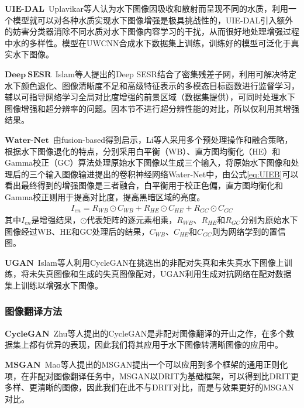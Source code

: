 $\mathbf{UIE}$-$\mathbf{DAL}$~Uplavikar等人\cite{uplavikar2019all}认为水下图像因吸收和散射而呈现不同的水质，利用一个模型就可以对各种水质实现水下图像增强是极具挑战性的，UIE-DAL引入额外的妨害分类器消除不同水质对水下图像内容学习的干扰，从而很好地处理增强过程中水的多样性。模型在UWCNN合成水下数据集上训练，训练好的模型可泛化于真实水下图像。

$\mathbf{Deep~SESR}$~Islam等人\cite{islam2020simultaneous}提出的Deep SESR结合了密集残差子网，利用可解决特定水下颜色退化、图像清晰度不足和高级特征表示的多模态目标函数进行监督学习，辅以可指导网络学习全局对比度增强的前景区域（数据集提供），可同时处理水下图像增强和超分辨率的问题。因本节不进行超分辨性能的对比，所以仅利用其增强结果。

$\mathbf{Water}$-$\mathbf{Net}$~由fusion-based\cite{ancuti2012enhancing}得到启示，Li等人\cite{li2019underwater}采用多个预处理操作和融合策略，根据水下图像退化的特点，分别采用白平衡（WB）、直方图均衡化（HE）和Gamma校正（GC）算法处理原始水下图像以生成三个输入，将原始水下图像和处理后的三个输入图像输进提出的卷积神经网络Water-Net中，由公式\ref{eq:UIEB}可以看出最终得到的增强图像是三者融合，白平衡用于校正色偏，直方图均衡化和Gamma校正则用于提高对比度，提高黑暗区域的亮度。
\begin{equation}
\begin{split}
I_{en}=R_{WB}\odot C_{WB}+R_{HE}\odot C_{HE}+R_{GC}\odot C_{GC}
\end{split}
\label{eq:UIEB}
\end{equation}
其中$I_{en}$是增强结果，$\odot$代表矩阵的逐元素相乘，$R_{WB}$、$R_{HE}$和$R_{GC}$分别为原始水下图像经过WB、HE和GC处理后的结果，$C_{WB}$、$C_{HE}$和$C_{GC}$则为网络学到的置信图。

$\mathbf{UGAN}$~Islam等人\cite{fabbri2018enhancing}利用CycleGAN在挑选出的非配对失真和未失真水下图像上训练，将未失真图像和生成的失真图像配对，UGAN利用生成对抗网络在配对数据集上训练以增强水下图像。

\subsubsection{图像翻译方法}

$\mathbf{CycleGAN}$~Zhu等人\cite{zhu2017unpaired}提出的CycleGAN是非配对图像翻译的开山之作，在多个数据集上都有优异的表现，因此我们将其应用于水下图像转清晰图像的应用中。

$\mathbf{MSGAN}$~Mao等人\cite{mao2019mode}提出的MSGAN提出一个可以应用到多个框架的通用正则化项，在非配对图像翻译任务中，MSGAN以DRIT为基础框架，可以得到比DRIT更多样、更清晰的图像，因此我们在此不与DRIT对比，而是与效果更好的MSGAN对比。

